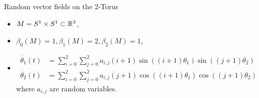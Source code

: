 \documentclass{beamer}
\begin{document}
\begin{frame}{Random vector fields on the 2-Torus}
    \begin{itemize}
        \item $M = S^1 \times S^1 \subset \mathbb{R}^3$, \pause 
        \item $\beta_0(M) = 1, \beta_1(M) = 2, \beta_2(M) = 1$, \pause
        \item 
            \begin{align*}
                \dot{\theta_1}(t) &= \sum_{i=0}^{2} \sum_{j=0}^{2} a_{{i,j}} (i+1)\sin((i+1)\theta_1)\sin((j+1)\theta_2) \\ 
                \dot{\theta_2}(t) &= \sum_{i=0}^{2} \sum_{j=0}^{2} a_{{i,j}} (j+1)\cos((i+1)\theta_1)\cos((j+1)\theta_2)
            \end{align*}
            where $a_{{i,j}}$ are random variables.
    \end{itemize}
\end{frame}
\end{document}
